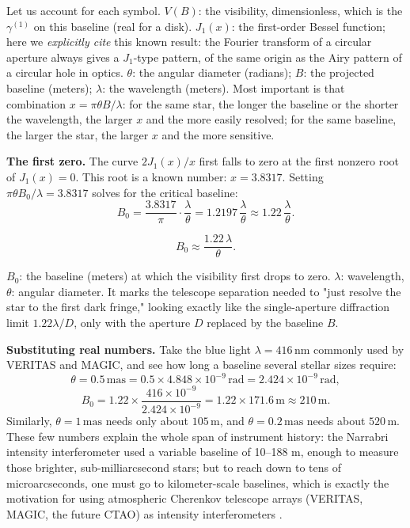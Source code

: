 Let us account for each symbol. \(V(B)\): the visibility, dimensionless, which is the \(\gamma^{(1)}\) on this baseline (real for a disk). \(J_1(x)\): the first-order Bessel function; here we \emph{explicitly cite} this known result: the Fourier transform of a circular aperture always gives a \(J_1\)-type pattern, of the same origin as the Airy pattern of a circular hole in optics. \(\theta\): the angular diameter (radians); \(B\): the projected baseline (meters); \(\lambda\): the wavelength (meters). Most important is that combination \(x=\pi\theta B/\lambda\): for the same star, the longer the baseline or the shorter the wavelength, the larger \(x\) and the more easily resolved; for the same baseline, the larger the star, the larger \(x\) and the more sensitive.

\textbf{The first zero.} The curve \(2J_1(x)/x\) first falls to zero at the first nonzero root of \(J_1(x)=0\). This root is a known number: \(x=3.8317\). Setting \(\pi\theta B_0/\lambda=3.8317\) solves for the critical baseline:
\[
  B_0=\frac{3.8317}{\pi}\cdot\frac{\lambda}{\theta}=1.2197\,\frac{\lambda}{\theta}\approx1.22\,\frac{\lambda}{\theta}.
\]

\begin{equation}
  B_0\approx\frac{1.22\,\lambda}{\theta}.
  \label{eq:e10-null}
\end{equation}
\begin{formulaexplain}
\(B_0\): the baseline (meters) at which the visibility first drops to zero. \(\lambda\): wavelength, \(\theta\): angular diameter. It marks the telescope separation needed to "just resolve the star to the first dark fringe," looking exactly like the single-aperture diffraction limit \(1.22\lambda/D\), only with the aperture \(D\) replaced by the baseline \(B\).
\end{formulaexplain}

\textbf{Substituting real numbers.} Take the blue light \(\lambda=416\,\mathrm{nm}\) commonly used by VERITAS and MAGIC, and see how long a baseline several stellar sizes require:
\[
  \theta=0.5\,\mathrm{mas}=0.5\times4.848\times10^{-9}\,\mathrm{rad}=2.424\times10^{-9}\,\mathrm{rad},
\]
\[
  B_0=1.22\times\frac{416\times10^{-9}}{2.424\times10^{-9}}
  =1.22\times171.6\,\mathrm{m}\approx210\,\mathrm{m}.
\]
Similarly, \(\theta=1\,\mathrm{mas}\) needs only about \(105\,\mathrm{m}\), and \(\theta=0.2\,\mathrm{mas}\) needs about \(520\,\mathrm{m}\). These few numbers explain the whole span of instrument history: the Narrabri intensity interferometer used a variable baseline of 10--188 m, enough to measure those brighter, sub-milliarcsecond stars; but to reach down to tens of microarcseconds, one must go to kilometer-scale baselines, which is exactly the motivation for using atmospheric Cherenkov telescope arrays (VERITAS, MAGIC, the future CTAO) as intensity interferometers \citep{1967MNRAS.137..375H,2020NatAs...4.1164A}.

